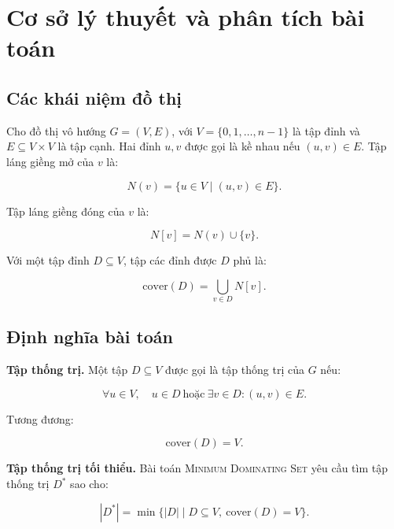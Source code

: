 \documentclass[12pt, a4paper]{report}
\newcommand{\MDS}{\textsc{Minimum Dominating Set}}
\begin{document}
\chapter{Cơ sở lý thuyết và phân tích bài toán}

\section{Các khái niệm đồ thị}

Cho đồ thị vô hướng $G=(V,E)$, với $V=\{0,1,\ldots,n-1\}$ là tập đỉnh và $E \subseteq V \times V$ là
tập cạnh. Hai đỉnh $u,v$ được gọi là kề nhau nếu $(u,v)\in E$. Tập láng giềng mở của $v$ là:

\begin{equation}
  N(v)=\{u \in V \mid (u,v)\in E\}.
\end{equation}

Tập láng giềng đóng của $v$ là:

\begin{equation}
  N[v]=N(v)\cup\{v\}.
\end{equation}

Với một tập đỉnh $D \subseteq V$, tập các đỉnh được $D$ phủ là:

\begin{equation}
  \mathrm{cover}(D)=\bigcup_{v\in D} N[v].
  \label{eq:cover}
\end{equation}

\section{Định nghĩa bài toán}

\textbf{Tập thống trị.} Một tập $D \subseteq V$ được gọi là tập thống trị của $G$ nếu:

\begin{equation}
  \forall u \in V,\quad u \in D \ \text{hoặc}\ \exists v \in D: (u,v)\in E.
\end{equation}

Tương đương:

\begin{equation}
  \mathrm{cover}(D)=V.
\end{equation}

\textbf{Tập thống trị tối thiểu.} Bài toán \MDS{} yêu cầu tìm tập thống trị $D^*$ sao cho:

\begin{equation}
  |D^*|=\min\{|D| \mid D \subseteq V,\ \mathrm{cover}(D)=V\}.
  \label{eq:mds}
\end{equation}
\end{document}
